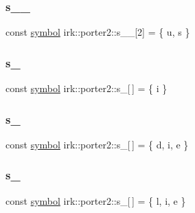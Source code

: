 \subsubsection{\texorpdfstring{s\+\_\+\_}{s\_2\_5}}
{\footnotesize\ttfamily const \mbox{\hyperlink{namespaceirk_1_1porter2_afd04c4eb58a1dabcf8f3ab2d7e9f9ed5}{symbol}} irk\+::porter2\+::s\+\_\+\_\mbox{[}2\mbox{]} = \{ \textquotesingle{}u\textquotesingle{}, \textquotesingle{}s\textquotesingle{} \}\hspace{0.3cm}{\ttfamily [static]}}

\mbox{\label{namespaceirk_1_1porter2_ab5c2ac405e182a4a3c74494fd3c94f5f}} 
\subsubsection{\texorpdfstring{s\+\_}{s\_3}}
{\footnotesize\ttfamily const \mbox{\hyperlink{namespaceirk_1_1porter2_afd04c4eb58a1dabcf8f3ab2d7e9f9ed5}{symbol}} irk\+::porter2\+::s\+\_\mbox{[}$\,$\mbox{]} = \{ \textquotesingle{}i\textquotesingle{} \}\hspace{0.3cm}{\ttfamily [static]}}

\mbox{\label{namespaceirk_1_1porter2_a5ea2a5bc907981e25361f9997c2cdee4}} 
\subsubsection{\texorpdfstring{s\+\_}{s\_30}}
{\footnotesize\ttfamily const \mbox{\hyperlink{namespaceirk_1_1porter2_afd04c4eb58a1dabcf8f3ab2d7e9f9ed5}{symbol}} irk\+::porter2\+::s\+\_\mbox{[}$\,$\mbox{]} = \{ \textquotesingle{}d\textquotesingle{}, \textquotesingle{}i\textquotesingle{}, \textquotesingle{}e\textquotesingle{} \}\hspace{0.3cm}{\ttfamily [static]}}

\mbox{\label{namespaceirk_1_1porter2_aacc2c296e95262534c857979a4cf2b10}} 
\subsubsection{\texorpdfstring{s\+\_}{s\_31}}
{\footnotesize\ttfamily const \mbox{\hyperlink{namespaceirk_1_1porter2_afd04c4eb58a1dabcf8f3ab2d7e9f9ed5}{symbol}} irk\+::porter2\+::s\+\_\mbox{[}$\,$\mbox{]} = \{ \textquotesingle{}l\textquotesingle{}, \textquotesingle{}i\textquotesingle{}, \textquotesingle{}e\textquotesingle{} \}\hspace{0.3cm}{\ttfamily [static]}}

